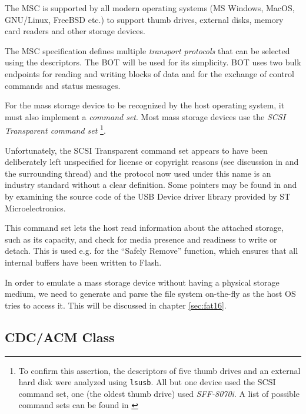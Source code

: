 The \gls{MSC} is supported by all modern operating systems (MS Windows, MacOS, GNU/Linux, FreeBSD etc.) to support thumb drives, external disks, memory card readers and other storage devices.


The \gls{MSC} specification \cite{usbif-msco} defines multiple \textit{transport protocols} that can be selected using the descriptors. The \gls{BOT} \cite{usbif-bot} will be used for its simplicity. \gls{BOT} uses two bulk endpoints for reading and writing blocks of data and for the exchange of control commands and status messages. 

For the mass storage device to be recognized by the host operating system, it must also implement a \textit{command set}. Most mass storage devices use the \textit{\gls{SCSI} Transparent command set}
\footnote{To confirm this assertion, the descriptors of five thumb drives and an external hard disk were analyzed using \verb|lsusb|. All but one device used the SCSI command set, one (the oldest thumb drive) used \textit{SFF-8070i}. A list of possible command sets can be found in \cite{usbif-msco}}. 

Unfortunately, the \gls{SCSI} Transparent command set appears to have been deliberately left unspecified for license or copyright reasons (see discussion in \cite{usb-tscsi-wtf} and the surrounding thread) and the protocol now used under this name is an industry standard without a clear definition. Some pointers may be found in \cite{usb-tscsi} and by examining the source code of the USB Device driver library provided by ST Microelectronics.

This command set lets the host read information about the attached storage, such as its capacity, and check for media presence and readiness to write or detach. This is used e.g. for the ``Safely Remove'' function, which ensures that all internal buffers have been written to Flash.

In order to emulate a mass storage device without having a physical storage medium, we need to generate and parse the file system on-the-fly as the host \gls{OS} tries to access it. This will be discussed in chapter \ref{sec:fat16}.

\subsection{CDC/ACM Class} \label{sec:cdc-acm}

